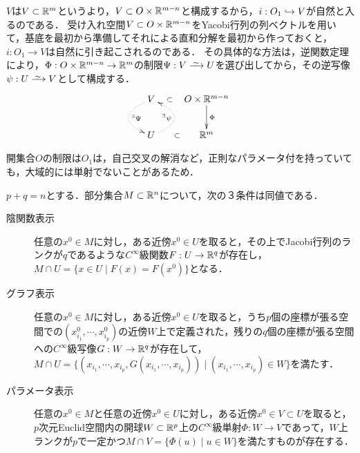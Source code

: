 \documentclass[uplatex,dvipdfmx]{jsreport}
\begin{document}
\begin{remarks}[本当にすごい証明だ]
    $V$は$V\subset\mathbb{R}^m$というより，$V\subset O\times\mathbb{R}^{m-n}$と構成するから，$i:O_1\hookrightarrow V$が自然と入るのである．
    受け入れ空間$V\subset O\times\mathbb{R}^{m-n}$をYacobi行列の列ベクトルを用いて，基底を最初から準備してそれによる直和分解を最初から作っておくと，$i:O_1\to V$は自然に引き起こされるのである．
    その具体的な方法は，逆関数定理により，$\Phi:O\times\mathbb{R}^{m-n}\to\mathbb{R}^m$の制限$\Psi:V\iso U$を選び出してから，その逆写像$\psi:U\iso V$として構成する．
    \[\xymatrix{
        V\ar@{.>}@/_2pc/[d]^-{{}^\exists\Psi}&\ar@{}[l]|-{\subset}O\times\R^{m-n}\ar[d]^-{\Phi}\\
        U\ar@{.>}@/_2pc/[u]^-{{}^\exists\psi}&\ar@{}[l]|-{\subset}\R^m
    }\]
\end{remarks}
\begin{remark}
    開集合$O$の制限は$O_1$は，自己交叉の解消など，正則なパラメータ付を持っていても，大域的には単射でないことがあるため．
\end{remark}

\begin{theorem}
    $p+q=n$とする．部分集合$M\subset\mathbb{R}^n$について，次の３条件は同値である．
    \begin{description}
        \item[陰関数表示] 任意の$x^0\in M$に対し，ある近傍$x^0\in U$を取ると，その上でJacobi行列のランクが$q$であるような$C^\infty$級関数$F:U\to\mathbb{R}^q$が存在し，$M\cap U=\{x\in U\mid F(x)=F(x^0)\}$となる．
        \item[グラフ表示] 任意の$x^0\in M$に対し，ある近傍$x^0\in U$を取ると，うち$p$個の座標が張る空間での$(x^0_{i_1},\cdots,x^0_{i_p})$の近傍$W$上で定義された，残りの$q$個の座標が張る空間への$C^\infty$級写像$G:W\to\mathbb{R}^q$が存在して，$M\cap U=\{(x_{i_1},\cdots,x_{i_p},G(x_{i_1},\cdots,x_{i_p}))\mid (x_{i_1},\cdots,x_{i_p})\in W\}$を満たす．
        \item[パラメータ表示] 任意の$x^0\in M$と任意の近傍$x^0\in U$に対し，ある近傍$x^0\in V\subset U$を取ると，$p$次元Euclid空間内の開球$W\subset\mathbb{R}^p$上の$C^\infty$級単射$\Phi:W\to V$であって，$W$上ランクが$p$で一定かつ$M\cap V=\{\Phi(u)\mid u\in W\}$を満たすものが存在する．
    \end{description}
\end{theorem}
\end{document}
